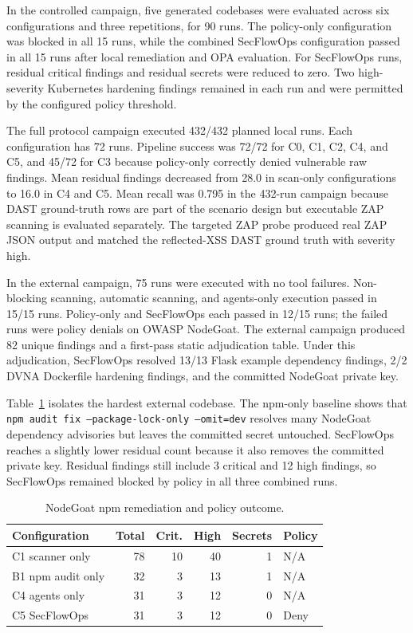 In the controlled campaign, five generated codebases were evaluated across six configurations and three repetitions, for 90 runs. The policy-only configuration was blocked in all 15 runs, while the combined SecFlowOps configuration passed in all 15 runs after local remediation and OPA evaluation. For SecFlowOps runs, residual critical findings and residual secrets were reduced to zero. Two high-severity Kubernetes hardening findings remained in each run and were permitted by the configured policy threshold.

The full protocol campaign executed 432/432 planned local runs. Each configuration has 72 runs. Pipeline success was 72/72 for C0, C1, C2, C4, and C5, and 45/72 for C3 because policy-only correctly denied vulnerable raw findings. Mean residual findings decreased from 28.0 in scan-only configurations to 16.0 in C4 and C5. Mean recall was 0.795 in the 432-run campaign because DAST ground-truth rows are part of the scenario design but executable ZAP scanning is evaluated separately. The targeted ZAP probe produced real ZAP JSON output and matched the reflected-XSS DAST ground truth with severity high.

In the external campaign, 75 runs were executed with no tool failures. Non-blocking scanning, automatic scanning, and agents-only execution passed in 15/15 runs. Policy-only and SecFlowOps each passed in 12/15 runs; the failed runs were policy denials on OWASP NodeGoat. The external campaign produced 82 unique findings and a first-pass static adjudication table. Under this adjudication, SecFlowOps resolved 13/13 Flask example dependency findings, 2/2 DVNA Dockerfile hardening findings, and the committed NodeGoat private key.

Table~\ref{tab:nodegoat-npm} isolates the hardest external codebase. The npm-only baseline shows that \texttt{npm audit fix --package-lock-only --omit=dev} resolves many NodeGoat dependency advisories but leaves the committed secret untouched. SecFlowOps reaches a slightly lower residual count because it also removes the committed private key. Residual findings still include 3 critical and 12 high findings, so SecFlowOps remained blocked by policy in all three combined runs.

\begin{table}[t]
\centering
\caption{NodeGoat npm remediation and policy outcome.}
\label{tab:nodegoat-npm}
\begin{tabular}{lrrrrl}
\toprule
Configuration & Total & Crit. & High & Secrets & Policy \\
\midrule
C1 scanner only & 78 & 10 & 40 & 1 & N/A \\
B1 npm audit only & 32 & 3 & 13 & 1 & N/A \\
C4 agents only & 31 & 3 & 12 & 0 & N/A \\
C5 SecFlowOps & 31 & 3 & 12 & 0 & Deny \\
\bottomrule
\end{tabular}
\end{table}

